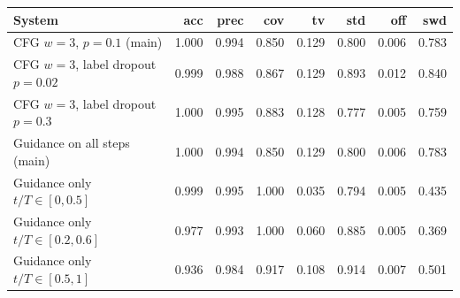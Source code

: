 \begin{tabular}{lrrrrrrr}\toprule System & acc & prec & cov & tv & std & off & swd \\\midrule
CFG $w=3$, $p=0.1$ (main) & 1.000 & 0.994 & 0.850 & 0.129 & 0.800 & 0.006 & 0.783 \\
CFG $w=3$, label dropout $p=0.02$ & 0.999 & 0.988 & 0.867 & 0.129 & 0.893 & 0.012 & 0.840 \\
CFG $w=3$, label dropout $p=0.3$ & 1.000 & 0.995 & 0.883 & 0.128 & 0.777 & 0.005 & 0.759 \\
\midrule
Guidance on all steps (main) & 1.000 & 0.994 & 0.850 & 0.129 & 0.800 & 0.006 & 0.783 \\
Guidance only $t/T\in[0,0.5]$ & 0.999 & 0.995 & 1.000 & 0.035 & 0.794 & 0.005 & 0.435 \\
Guidance only $t/T\in[0.2,0.6]$ & 0.977 & 0.993 & 1.000 & 0.060 & 0.885 & 0.005 & 0.369 \\
Guidance only $t/T\in[0.5,1]$ & 0.936 & 0.984 & 0.917 & 0.108 & 0.914 & 0.007 & 0.501 \\
\bottomrule\end{tabular}
